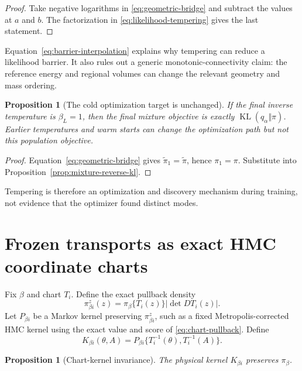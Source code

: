 \documentclass[11pt]{article}
\newtheorem{proposition}[theorem]{Proposition}
\theoremstyle{definition}
\theoremstyle{remark}
\newcommand{\KL}{\operatorname{KL}}
\newcommand{\1}{\mathbf{1}}
\newcommand{\abs}[1]{\left|#1\right|}
\begin{document}
\begin{proof}
Take negative logarithms in \eqref{eq:geometric-bridge} and subtract the values
at $a$ and $b$.  The factorization in \eqref{eq:likelihood-tempering} gives the
last statement.
\end{proof}

Equation~\eqref{eq:barrier-interpolation} explains why tempering can reduce a
likelihood barrier.  It also rules out a generic monotonic-connectivity claim:
the reference energy and regional volumes can change the relevant geometry and
mass ordering.

\begin{proposition}[The cold optimization target is unchanged]
\label{prop:cold-objective}
If the final inverse temperature is $\beta_L=1$, then the final mixture
objective is exactly $\KL(q_\alpha\Vert\pi)$.  Earlier temperatures and warm
starts can change the optimization path but not this population objective.
\end{proposition}

\begin{proof}
Equation~\eqref{eq:geometric-bridge} gives
$\widetilde\pi_1=\widetilde\pi$, hence $\pi_1=\pi$.  Substitute into
Proposition~\ref{prop:mixture-reverse-kl}.
\end{proof}

Tempering is therefore an optimization and discovery mechanism during training,
not evidence that the optimizer found distinct modes.

\section{Frozen transports as exact HMC coordinate charts}

Fix $\beta$ and chart $T_i$.  Define the exact pullback density
\begin{equation}
 \pi_{\beta i}^z(z)
 =\pi_\beta\{T_i(z)\}\abs{\det DT_i(z)}.
 \label{eq:chart-pullback}
\end{equation}
Let $P_{\beta i}$ be a Markov kernel preserving
$\pi_{\beta i}^z$, such as a fixed Metropolis-corrected HMC kernel using the
exact value and score of \eqref{eq:chart-pullback}.  Define
\begin{equation}
 K_{\beta i}(\theta,A)
 =P_{\beta i}\{T_i^{-1}(\theta),T_i^{-1}(A)\}.
 \label{eq:physical-chart-kernel}
\end{equation}

\begin{proposition}[Chart-kernel invariance]
\label{prop:chart-invariance}
The physical kernel $K_{\beta i}$ preserves $\pi_\beta$.
\end{proposition}
\end{document}
